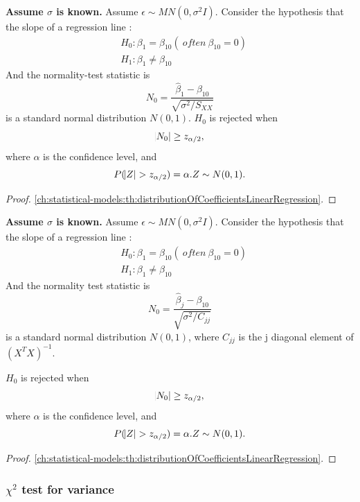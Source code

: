\begin{refsection}
\begin{method}\cite[261]{chinese2008probability}
	\textbf{Assume $\sigma$ is known.}	Assume $\epsilon \sim MN(0,\sigma^2 I)$. Consider the hypothesis that the slope of a regression line :
	\begin{align*}
	&H_0: \beta_1 = \beta_{10} (~often ~ \beta_{10} = 0)\\
	&H_1: \beta_1 \neq \beta_{10}
	\end{align*}
	And the normality-test statistic is
	$$N_0 = \frac{\hat{\beta}_1 - \beta_{10}}{\sqrt{\sigma^2/S_{XX}}}$$
	is a standard normal distribution $N(0,1)$. 
		$H_0$ is rejected when $$\abs{N_0}\geq z_{\alpha/2},$$
	where $\alpha$ is the confidence level, and  $$P(\abs{Z} > z_{\alpha/2}) = \alpha. Z\sim N(0,1).$$
	
\end{method}
\begin{proof}
	\autoref{ch:statistical-models:th:distributionOfCoefficientsLinearRegression}.
\end{proof}

\begin{method}\cite[261]{chinese2008probability}
	\textbf{Assume $\sigma$ is known.}	Assume $\epsilon \sim MN(0,\sigma^2 I)$. Consider the hypothesis that the slope of a regression line :
	\begin{align*}
	&H_0: \beta_1 = \beta_{10} (~often ~ \beta_{10} = 0)\\
	&H_1: \beta_1 \neq \beta_{10}
	\end{align*}
	And the normality test statistic is
	$$N_0 = \frac{\hat{\beta}_j - \beta_{10}}{\sqrt{\sigma^2/C_{jj}}}$$
	is a standard normal distribution $N(0,1)$,	where $C_{jj}$ is the j diagonal element of $(X^TX)^{-1}$.
	
	$H_0$ is rejected when $$\abs{N_0}\geq z_{\alpha/2},$$
	where $\alpha$ is the confidence level, and  $$P(\abs{Z} > z_{\alpha/2}) = \alpha. Z\sim N(0,1).$$
	
\end{method}
\begin{proof}
	\autoref{ch:statistical-models:th:distributionOfCoefficientsLinearRegression}.
\end{proof}

\subsubsection{$\chi^2$ test for variance}


\end{refsection}
